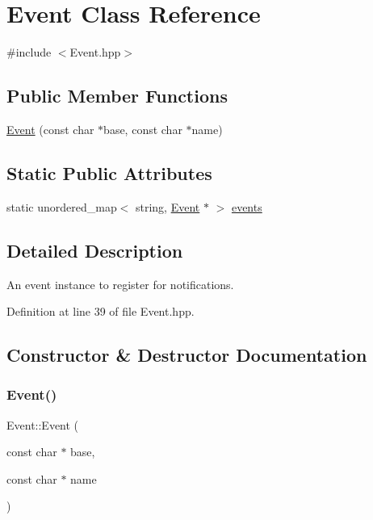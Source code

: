 \hypertarget{classEvent}{}\section{Event Class Reference}
\label{classEvent}


{\ttfamily \#include $<$Event.\+hpp$>$}

\subsection*{Public Member Functions}
\begin{DoxyCompactItemize}
\item 
\mbox{\hyperlink{classEvent_aad90826e5e8880a47978f1701a99722f}{Event}} (const char $\ast$base, const char $\ast$name)
\end{DoxyCompactItemize}
\subsection*{Static Public Attributes}
\begin{DoxyCompactItemize}
\item 
static unordered\+\_\+map$<$ string, \mbox{\hyperlink{classEvent}{Event}} $\ast$ $>$ \mbox{\hyperlink{classEvent_a00278e70937755acde8c5d749c035c29}{events}}
\end{DoxyCompactItemize}


\subsection{Detailed Description}
An event instance to register for notifications. 

Definition at line 39 of file Event.\+hpp.



\subsection{Constructor \& Destructor Documentation}
\mbox{\label{classEvent_aad90826e5e8880a47978f1701a99722f}} 
\subsubsection{\texorpdfstring{Event()}{Event()}}
{\footnotesize\ttfamily Event\+::\+Event (\begin{DoxyParamCaption}\item[{const char $\ast$}]{base,  }\item[{const char $\ast$}]{name }\end{DoxyParamCaption})\hspace{0.3cm}{\ttfamily [inline]}}

